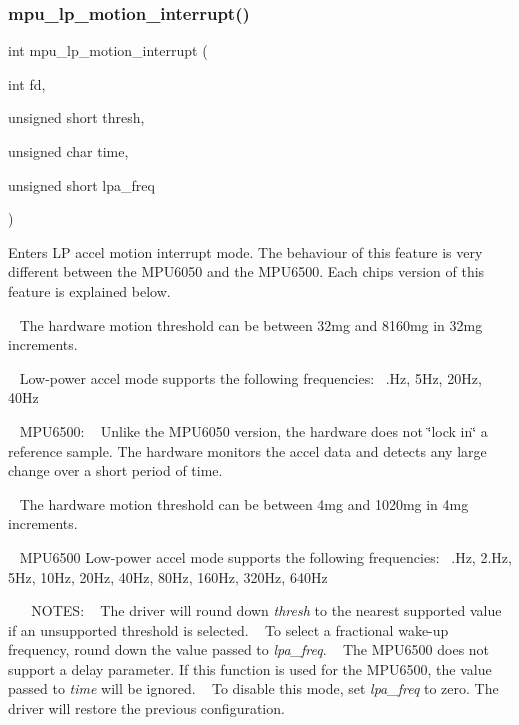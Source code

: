\subsubsection{mpu\+\_\+lp\+\_\+motion\+\_\+interrupt()}
{\footnotesize\ttfamily int mpu\+\_\+lp\+\_\+motion\+\_\+interrupt (\begin{DoxyParamCaption}\item[{int}]{fd,  }\item[{unsigned short}]{thresh,  }\item[{unsigned char}]{time,  }\item[{unsigned short}]{lpa\+\_\+freq }\end{DoxyParamCaption})}



Enters LP accel motion interrupt mode. The behaviour of this feature is very different between the M\+P\+U6050 and the M\+P\+U6500. Each chip\textquotesingle{}s version of this feature is explained below. 

~\newline
 The hardware motion threshold can be between 32mg and 8160mg in 32mg increments.

~\newline
 Low-\/power accel mode supports the following frequencies\+: ~.\+Hz, 5\+Hz, 20\+Hz, 40\+Hz

~\newline
 M\+P\+U6500\+: ~\newline
 Unlike the M\+P\+U6050 version, the hardware does not \char`\"{}lock in\char`\"{} a reference sample. The hardware monitors the accel data and detects any large change over a short period of time.

~\newline
 The hardware motion threshold can be between 4mg and 1020mg in 4mg increments.

~\newline
 M\+P\+U6500 Low-\/power accel mode supports the following frequencies\+: ~.\+Hz, 2.\+Hz, 5\+Hz, 10\+Hz, 20\+Hz, 40\+Hz, 80\+Hz, 160\+Hz, 320\+Hz, 640\+Hz

~\newline
~\newline
 N\+O\+T\+ES\+: ~\newline
 The driver will round down {\itshape thresh} to the nearest supported value if an unsupported threshold is selected. ~\newline
 To select a fractional wake-\/up frequency, round down the value passed to {\itshape lpa\+\_\+freq}. ~\newline
 The M\+P\+U6500 does not support a delay parameter. If this function is used for the M\+P\+U6500, the value passed to {\itshape time} will be ignored. ~\newline
 To disable this mode, set {\itshape lpa\+\_\+freq} to zero. The driver will restore the previous configuration.



